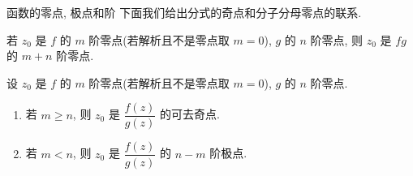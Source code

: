 






\begin{frame}{函数的零点, 极点和阶}
	\onslide<+->
	下面我们给出分式的奇点和分子分母零点的联系.
	\onslide<+->
	\begin{proposition}
		若 $z_0$ 是 $f$ 的 $m$ 阶零点(若解析且不是零点取 $m=0$), $g$ 的 $n$ 阶零点, 则 $z_0$ 是 $fg$ 的 $m+n$ 阶零点.
	\end{proposition}
	\onslide<+->
	\begin{proposition}
		设 $z_0$ 是 $f$ 的 $m$ 阶零点(若解析且不是零点取 $m=0$),  $g$ 的 $n$ 阶零点.
		\begin{enumerate}
			\item 若 $m\ge n$, 则 $z_0$ 是 $\dfrac{f(z)}{g(z)}$ 的可去奇点.
			\item 若 $m<n$, 则 $z_0$ 是 $\dfrac{f(z)}{g(z)}$ 的 $n-m$ 阶极点.
		\end{enumerate}
	\end{proposition}
\end{frame}


